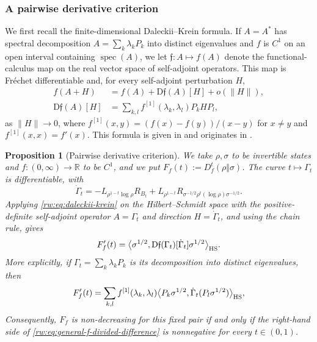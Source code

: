 \documentclass[11pt]{article}
\newtheorem{proposition}[proposition]{Proposition}
\theoremstyle{remark}
\newcommand{\1}{\mathbbm{1}}
\begin{document}
\subsubsection{A pairwise derivative criterion}

We first recall the finite-dimensional Daleckii--Krein formula.  If
$A=A^*$ has spectral decomposition $A=\sum_k\lambda_kP_k$ into
distinct eigenvalues and $f$ is $C^1$ on an open interval containing
$\operatorname{spec}(A)$, we let $\mathfrak f:A\mapsto f(A)$ denote the
functional-calculus map on the real vector space of self-adjoint
operators.  This map is Fr\'echet differentiable and, for every
self-adjoint perturbation $H$,
\begin{align}
 f(A+H)
 &=f(A)+\mathrm D\mathfrak f(A)[H]+o(\lVert H\rVert),\nonumber\\
 \mathrm D\mathfrak f(A)[H]
 &=\sum_{k,l}f^{[1]}(\lambda_k,\lambda_l)P_kHP_l,
 \label{rw:eq:daleckii-krein}
\end{align}
as $\lVert H\rVert\to0$, where
$f^{[1]}(x,y)=(f(x)-f(y))/(x-y)$ for $x\neq y$ and
$f^{[1]}(x,x)=f'(x)$.  This formula is given in
\cite[(2.38), p.~60]{bhatia2009positive} and originates in
\cite{daletskii1965integration}.

\begin{proposition}[Pairwise derivative criterion]
\label{rw:prop:general-f-pairwise-criterion}
We take $\rho,\sigma$ to be invertible states and
$f:(0,\infty)\to\mathbb R$ to be $C^1$, and we put
$F_f(t):=D_f^t(\rho\Vert\sigma)$.  The curve
$t\mapsto\Gamma_t$ is differentiable, with
\begin{equation}
 \dot\Gamma_t
 =-L_{\rho^{1-t}\log\rho}R_{B_t}
  +L_{\rho^{1-t}}
   R_{\sigma^{-1/2}\rho^t(\log\rho)\sigma^{-1/2}}.
 \label{rw:eq:gamma-derivative}
\end{equation}
Applying \eqref{rw:eq:daleckii-krein} on the Hilbert--Schmidt space
with the positive-definite self-adjoint operator $A=\Gamma_t$ and
direction $H=\dot\Gamma_t$, and using the chain rule, gives
\begin{equation}
 F_f'(t)
 =\big\langle\sigma^{1/2},
 \mathrm D\mathfrak f(\Gamma_t)[\dot\Gamma_t]
 \sigma^{1/2}\big\rangle_{\rm HS}.
 \label{rw:eq:general-f-derivative}
\end{equation}
More explicitly, if
$\Gamma_t=\sum_k\lambda_kP_k$ is its decomposition into distinct
eigenvalues, then
\begin{equation}
 F_f'(t)
 =\sum_{k,l}f^{[1]}(\lambda_k,\lambda_l)
 \big\langle P_k\sigma^{1/2},
 \dot\Gamma_t(P_l\sigma^{1/2})\big\rangle_{\rm HS},
 \label{rw:eq:general-f-divided-difference}
\end{equation}
Consequently, $F_f$ is non-decreasing for this
fixed pair if and only if the right-hand side of
\eqref{rw:eq:general-f-divided-difference} is nonnegative for every
$t\in(0,1)$.
\end{proposition}
\end{document}

